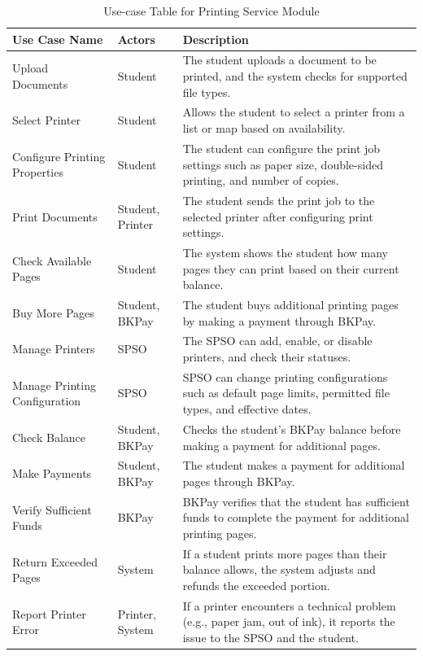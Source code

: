 \documentclass[a4paper]{report}
\begin{document}
\clearpage
\begin{table}[h!]
\centering
\renewcommand{\arraystretch}{1.8}
\begin{tabular}{|>{\raggedright\arraybackslash}p{3cm}|>{\centering\arraybackslash}p{3cm}|p{7cm}|}
\hline
\textbf{Use Case Name} & \textbf{Actors} & \textbf{Description} \\ \hline
Upload Documents & Student & The student uploads a document to be printed, and the system checks for supported file types. \\ \hline
Select Printer & Student & Allows the student to select a printer from a list or map based on availability. \\ \hline
Configure Printing Properties & Student & The student can configure the print job settings such as paper size, double-sided printing, and number of copies. \\ \hline
Print Documents & Student, Printer & The student sends the print job to the selected printer after configuring print settings. \\ \hline
Check Available Pages & Student & The system shows the student how many pages they can print based on their current balance. \\ \hline
Buy More Pages & Student, BKPay & The student buys additional printing pages by making a payment through BKPay. \\ \hline
Manage Printers & SPSO & The SPSO can add, enable, or disable printers, and check their statuses. \\ \hline
Manage Printing Configuration & SPSO & SPSO can change printing configurations such as default page limits, permitted file types, and effective dates. \\ \hline
Check Balance & Student, BKPay & Checks the student’s BKPay balance before making a payment for additional pages. \\ \hline
Make Payments & Student, BKPay & The student makes a payment for additional pages through BKPay. \\ \hline
Verify Sufficient Funds & BKPay & BKPay verifies that the student has sufficient funds to complete the payment for additional printing pages. \\ \hline
Return Exceeded Pages & System & If a student prints more pages than their balance allows, the system adjusts and refunds the exceeded portion. \\ \hline
Report Printer Error & Printer, System & If a printer encounters a technical problem (e.g., paper jam, out of ink), it reports the issue to the SPSO and the student. \\ [1ex] \hline
\end{tabular}
\caption{Use-case Table for Printing Service Module}
\label{tab:printing_service_use_case}
\end{table}
\end{document}
